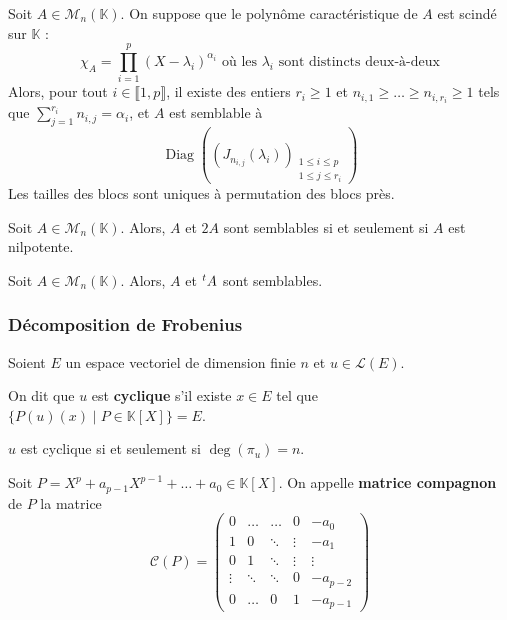 
  \begin{theorem}
    Soit $A \in \mathcal{M}_n(\mathbb{K})$. On suppose que le polynôme caractéristique de $A$ est scindé sur $\mathbb{K}$ :
    \[ \chi_A = \prod_{i=1}^p (X - \lambda_i)^{\alpha_i} \text{ où les } \lambda_i \text{ sont distincts deux-à-deux} \]
    Alors, pour tout $i \in \llbracket 1,p \rrbracket$, il existe des entiers $r_i \geq 1$ et $n_{i,1} \geq \dots \geq n_{i,r_i} \geq 1$ tels que $\sum_{j=1}^{r_i} n_{i,j} = \alpha_i$, et $A$ est semblable à
    \[ \operatorname{Diag}\left(\left(J_{n_{i,j}}(\lambda_i)\right)_{\substack{1 \leq i \leq p \\ 1 \leq j \leq r_i}}\right) \]
    Les tailles des blocs sont uniques à permutation des blocs près.
  \end{theorem}

  \begin{application}
    Soit $A \in \mathcal{M}_n(\mathbb{K})$. Alors, $A$ et $2A$ sont semblables si et seulement si $A$ est nilpotente.
  \end{application}

  \begin{application}
    Soit $A \in \mathcal{M}_n(\mathbb{K})$. Alors, $A$ et $\mathstrut ^t A$ sont semblables.
  \end{application}

  \subsubsection{Décomposition de Frobenius}


  Soient $E$ un espace vectoriel de dimension finie $n$ et $u \in \mathcal{L}(E)$.

  \begin{definition}
    \label{154-1}
    On dit que $u$ est \textbf{cyclique} s'il existe $x \in E$ tel que $\{ P(u)(x) \mid P \in \mathbb{K}[X] \} = E$.
  \end{definition}

  \begin{proposition}
    $u$ est cyclique si et seulement si $\deg(\pi_u) = n$.
  \end{proposition}

  \begin{definition}
    Soit $P = X^p + a_{p-1} X^{p-1} + \dots + a_0 \in \mathbb{K}[X]$. On appelle \textbf{matrice compagnon} de $P$ la matrice
    \[ \mathcal{C}(P) = \begin{pmatrix} 0 & \dots & \dots & 0 & -a_0 \\ 1 & 0 & \ddots & \vdots & -a_1 \\ 0 & 1 & \ddots & \vdots & \vdots \\ \vdots & \ddots & \ddots & 0 & -a_{p-2} \\ 0 & \dots & 0 & 1 & -a_{p-1} \end{pmatrix} \]
  \end{definition}

